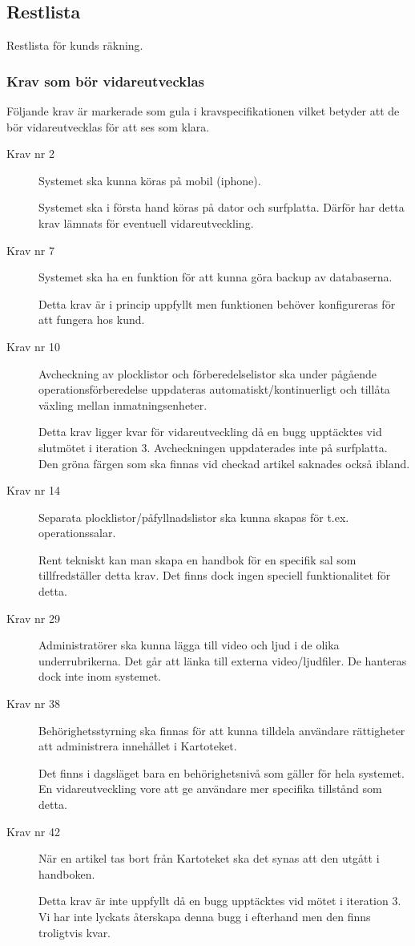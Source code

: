 \documentclass{article}
\begin{document}
\subsection{Restlista}
Restlista för kunds räkning. 
\subsubsection{Krav som bör vidareutvecklas}
Följande krav är markerade som gula i kravspecifikationen vilket betyder att de bör vidareutvecklas för att ses som klara.
\begin{description}
\item[Krav nr 2] Systemet ska kunna köras på mobil (iphone).

Systemet ska i första hand köras på dator och surfplatta. Därför har detta krav lämnats för eventuell vidareutveckling.

\item[Krav nr 7] Systemet ska ha en funktion för att kunna göra backup av databaserna.

Detta krav är i princip uppfyllt men funktionen behöver konfigureras för att fungera hos kund. 
\item[Krav nr 10] Avcheckning av plocklistor och förberedelselistor ska under pågående operationsförberedelse uppdateras automatiskt/kontinuerligt och tillåta växling mellan inmatningsenheter.

Detta krav ligger kvar för vidareutveckling då en bugg upptäcktes vid slutmötet i iteration 3. Avcheckningen uppdaterades inte på surfplatta. Den gröna färgen som ska finnas vid checkad artikel saknades också ibland.
\item[Krav nr 14] Separata plocklistor/påfyllnadslistor ska kunna skapas för t.ex. operationssalar.

Rent tekniskt kan man skapa en handbok för en specifik sal som tillfredställer detta krav. Det finns dock ingen speciell funktionalitet för detta.
\item[Krav nr 29] Administratörer ska kunna lägga till video och ljud i de olika underrubrikerna.
Det går att länka till externa video/ljudfiler. De hanteras dock inte inom systemet. 
\item[Krav nr 38] Behörighetsstyrning ska finnas för att kunna tilldela användare rättigheter att administrera innehållet i Kartoteket.

Det finns i dagsläget bara en behörighetsnivå som gäller för hela systemet. En vidareutveckling vore att ge användare mer specifika tillstånd som detta.
\item[Krav nr 42] När en artikel tas bort från Kartoteket ska det synas att den utgått i handboken.

Detta krav är inte uppfyllt då en bugg upptäcktes vid mötet i iteration 3. Vi har inte lyckats återskapa denna bugg i efterhand men den finns troligtvis kvar. \end{description}
\end{document}
